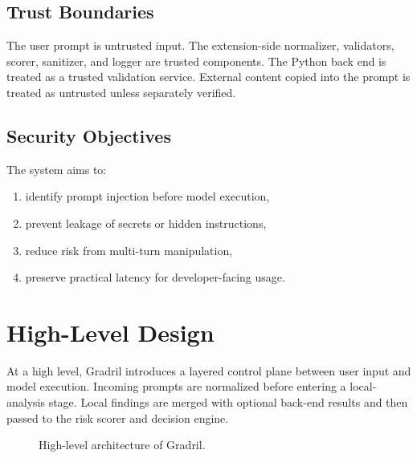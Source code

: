 \documentclass[journal]{IEEEtran}
\begin{document}
\subsection{Trust Boundaries}
The user prompt is untrusted input. The extension-side normalizer, validators, scorer, sanitizer, and logger are trusted components. The Python back end is treated as a trusted validation service. External content copied into the prompt is treated as untrusted unless separately verified.

\subsection{Security Objectives}
The system aims to:
\begin{enumerate}
    \item identify prompt injection before model execution,
    \item prevent leakage of secrets or hidden instructions,
    \item reduce risk from multi-turn manipulation,
    \item preserve practical latency for developer-facing usage.
\end{enumerate}

\section{High-Level Design}
At a high level, Gradril introduces a layered control plane between user input and model execution. Incoming prompts are normalized before entering a local-analysis stage. Local findings are merged with optional back-end results and then passed to the risk scorer and decision engine.

\begin{figure}[ht]
\centering
{}
\caption{High-level architecture of Gradril.}
\end{figure}
\end{document}
